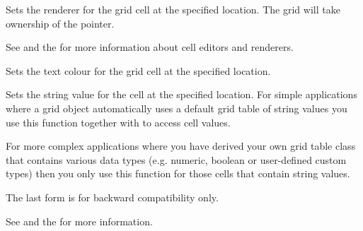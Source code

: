 \label{wxgridsetcellrenderer}


Sets the renderer for the grid cell at the specified location.
The grid will take ownership of the pointer.

See  and
the  for more information about cell editors and renderers.



\label{wxgridsetcelltextcolour}




Sets the text colour for the grid cell at the specified location.



\label{wxgridsetcellvalue}




Sets the string value for the cell at the specified location. For simple applications where a
grid object automatically uses a default grid table of string values you use this function together
with  to access cell values.

For more complex applications where you have derived your own grid table class that contains
various data types (e.g. numeric, boolean or user-defined custom types) then you only use this
function for those cells that contain string values.

The last form is for backward compatibility only.

See 
and the  for more information.



